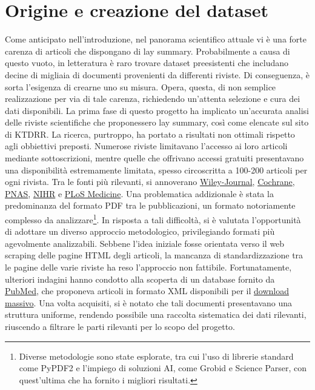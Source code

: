 \documentclass[12pt,a4paper,twoside,openright]{book}
\begin{document}
\section{Origine e creazione del dataset}
Come anticipato nell'introduzione, nel panorama scientifico attuale vi è una forte carenza di articoli che dispongano di lay summary. Probabilmente a causa di questo vuoto, in letteratura è raro trovare dataset preesistenti che includano decine di migliaia di documenti provenienti da differenti riviste. Di conseguenza, è sorta l'esigenza di crearne uno su misura. Opera, questa, di non semplice realizzazione per via di tale carenza, richiedendo un'attenta selezione e cura dei dati disponibili.
La prima fase di questo progetto ha implicato un'accurata analisi delle riviste scientifiche che proponessero lay summary, così come elencate sul sito di KTDRR. La ricerca, purtroppo, ha portato a risultati non ottimali rispetto agli obbiettivi preposti. Numerose riviste limitavano l'accesso ai loro articoli mediante sottoscrizioni, mentre quelle che offrivano accessi gratuiti presentavano una disponibilità estremamente limitata, spesso circoscritta a 100-200 articoli per ogni rivista. Tra le fonti più rilevanti, si annoverano \href{https://onlinelibrary.wiley.com/}{Wiley-Journal}, \href{https://www.cochranelibrary.com/cdsr/reviews}{Cochrane}, \href{https://www.pnas.org/}{PNAS}, \href{https://www.journalslibrary.nihr.ac.uk/#/}{NIHR} e \href{https://journals.plos.org/plosmedicine/issue?id=10.1371/issue.pmed.v20.i01}{PLoS Medicine}. 
Una problematica addizionale è stata la predominanza del formato PDF tra le pubblicazioni, un formato notoriamente complesso da analizzare\footnote{Diverse metodologie sono state esplorate, tra cui l'uso di librerie standard come PyPDF2 e l'impiego di soluzioni AI, come Grobid e Science Parser, con quest'ultima che ha fornito i migliori risultati.}. 
In risposta a tali difficoltà, si è valutata l'opportunità di adottare un diverso approccio metodologico, privilegiando formati più agevolmente analizzabili. Sebbene l'idea iniziale fosse orientata verso il web scraping delle pagine HTML degli articoli, la mancanza di standardizzazione tra le pagine delle varie riviste ha reso l'approccio non fattibile.
Fortunatamente, ulteriori indagini hanno condotto alla scoperta di un database fornito da \href{https://pubmed.ncbi.nlm.nih.gov/}{PubMed}, che proponeva articoli in formato XML disponibili per il \href{https://ftp.ncbi.nlm.nih.gov/pub/pmc/oa_bulk/oa_comm/}{download massivo}. Una volta acquisiti, si è notato che tali documenti presentavano una struttura uniforme, rendendo possibile una raccolta sistematica dei dati rilevanti, riuscendo a filtrare le parti rilevanti per lo scopo del progetto.
\end{document}
